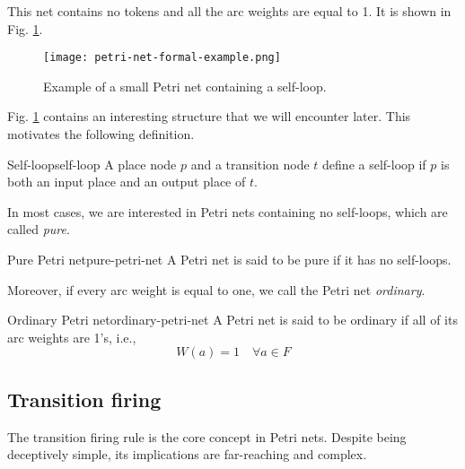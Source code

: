 This net contains no tokens and all the arc weights are equal to 1.
It is shown in Fig. \ref{fig:petri-net-formal-example}.

\begin{figure}[!htb]
      \centering
      \texttt{[image: petri-net-formal-example.png]}
      \caption{Example of a small Petri net containing a self-loop.}
      \label{fig:petri-net-formal-example}
\end{figure}

Fig. \ref{fig:petri-net-formal-example} contains an interesting structure
that we will encounter later.
This motivates the following definition.

\begin{definition}{Self-loop}{self-loop}
      A place node $p$ and a transition node $t$ define a self-loop
      if $p$ is both an input place and an output place of $t$.
\end{definition}

In most cases, we are interested in Petri nets containing no self-loops,
which are called \emph{pure}.

\begin{definition}{Pure Petri net}{pure-petri-net}
      A Petri net is said to be pure if it has no self-loops.
\end{definition}

Moreover, if every arc weight is equal to one, we call the Petri net \emph{ordinary}.

\begin{definition}{Ordinary Petri net}{ordinary-petri-net}
      A Petri net is said to be ordinary if all of its arc weights are 1's, i.e.,
      \begin{equation*}
            W(a) = 1 \quad \forall a \in F
      \end{equation*}
\end{definition}

\subsection{Transition firing}
\label{sec:transition-firing}

The transition firing rule is the core concept in Petri nets.
Despite being deceptively simple, its implications are far-reaching and complex.

